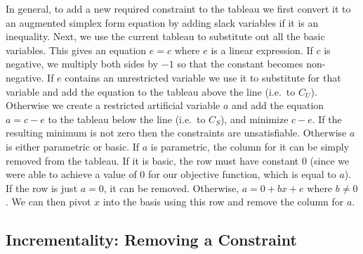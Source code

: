 \documentclass{article}
\begin{document}
In general, to add a new required constraint to the tableau we first
convert it to an augmented simplex form equation by adding slack variables
if it is an inequality.  Next, we use the current tableau to substitute out
all the basic variables.  This gives an equation $e = c$ where $e$ is a
linear expression.  If $c$ is negative, we multiply both sides by $-1$ so
that the constant becomes non-negative.  If $e$ contains an unrestricted
variable we use it to substitute for that variable and add the equation to
the tableau above the line (i.e.\ to $C_U$).  Otherwise we create a
restricted artificial variable $a$ and add the equation $a = c - e$ to the
tableau below the line (i.e.\ to $C_S$), and minimize $c - e$. If the
resulting minimum is not zero then the constraints are unsatisfiable.
Otherwise $a$ is either parametric or basic.  If $a$ is parametric, the
column for it can be simply removed from the tableau.  If it is basic, the
row must have constant 0 (since we were able to achieve a value of 0 for
our objective function, which is equal to $a$).  If the row is just $a =
0$, it can be removed.  Otherwise, $a = 0 + b x + e$ where $b \neq 0$.  We
can then pivot $x$ into the basis using this row and remove the column for
$a$.


\subsection{Incrementality: Removing a Constraint}
\label{removing-constraints}
\end{document}
